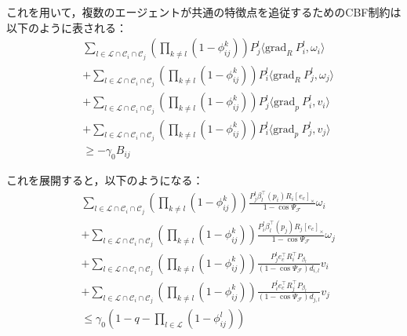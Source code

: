 これを用いて，複数のエージェントが共通の特徴点を追従するためのCBF制約は以下のように表される：
\begin{equation}
\begin{aligned}
&\sum_{l \in \mathcal{L} \cap \mathcal{C}_i \cap \mathcal{C}_j}\left(\prod_{k \neq l}(1 - \phi_{ij}^k)\right)P_j^l \langle \mathrm{grad}_R\:P_i^l, \omega_i \rangle \\
&+ \sum_{l \in \mathcal{L} \cap \mathcal{C}_i \cap \mathcal{C}_j}\left(\prod_{k \neq l}(1 - \phi_{ij}^k)\right)P_i^l \langle \mathrm{grad}_R\:P_j^l, \omega_j \rangle \\
&+ \sum_{l \in \mathcal{L} \cap \mathcal{C}_i \cap \mathcal{C}_j}\left(\prod_{k \neq l}(1 - \phi_{ij}^k)\right)P_j^l \langle \mathrm{grad}_p\:P_i^l, v_i \rangle \\
&+ \sum_{l \in \mathcal{L} \cap \mathcal{C}_i \cap \mathcal{C}_j}\left(\prod_{k \neq l}(1 - \phi_{ij}^k)\right)P_i^l \langle \mathrm{grad}_p\:P_j^l, v_j \rangle \\
&\geq -\gamma_0 B_{ij}
\label{eq:common_cbf_constraint}
\end{aligned}
\end{equation}

これを展開すると，以下のようになる：
\begin{equation}
\begin{aligned}
&\sum_{l \in \mathcal{L} \cap \mathcal{C}_i \cap \mathcal{C}_j}\left(\prod_{k \neq l}(1 - \phi_{ij}^k)\right) \frac{P_j^l\beta_l^\top(p_i) R_i [e_c]_\times}{1 - \cos\Psi_{\mathcal{F}}}\omega_i \\
&+ \sum_{l \in \mathcal{L} \cap \mathcal{C}_i \cap \mathcal{C}_j}\left(\prod_{k \neq l}(1 - \phi_{ij}^k)\right) \frac{P_i^l\beta_l^\top(p_j) R_j [e_c]_\times}{1 - \cos\Psi_{\mathcal{F}}}\omega_j \\
&+ \sum_{l \in \mathcal{L} \cap \mathcal{C}_i \cap \mathcal{C}_j}\left(\prod_{k \neq l}(1 - \phi_{ij}^k)\right)\frac{P_j^le_c^\top R_i^\top P_{\beta_l}}{(1 - \cos\Psi_{\mathcal{F}})d_{i,l}}v_i \\
&+ \sum_{l \in \mathcal{L} \cap \mathcal{C}_i \cap \mathcal{C}_j}\left(\prod_{k \neq l}(1 - \phi_{ij}^k)\right)\frac{P_i^le_c^\top R_j^\top P_{\beta_l}}{(1 - \cos\Psi_{\mathcal{F}})d_{j,l}}v_j \\
&\leq \gamma_0 \left(1 - q - \prod_{l \in \mathcal{L}}(1 - \phi_{ij}^l)\right)
\label{eq:common_cbf_constraint_expanded}
\end{aligned}
\end{equation}


